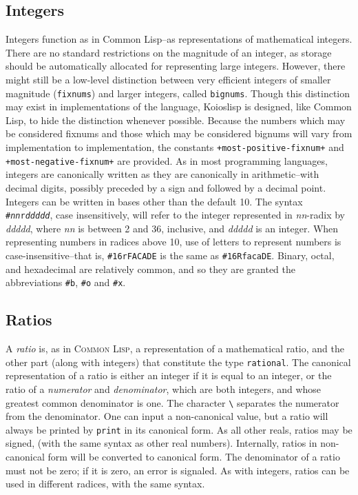 \documentclass[10pt]{book}
\begin{document}
\subsection{Integers}
Integers function as in Common Lisp--as representations of mathematical integers. There are no standard restrictions on the magnitude of an integer, as storage should be automatically allocated for representing large integers. However, there might still be a low-level distinction between very efficient integers of smaller magnitude (\texttt{fixnums}) and larger integers, called \texttt{bignums}. Though this distinction may exist in implementations of the language, Koioslisp is designed, like Common Lisp, to hide the distinction whenever possible. Because the numbers which may be considered fixnums and those which may be considered bignums will vary from implementation to implementation, the constants \texttt{+most-positive-fixnum+} and \texttt{+most-negative-fixnum+} are provided.%
As in most programming languages, integers are canonically written as they are canonically in arithmetic--with decimal digits, possibly preceded by a sign and followed by a decimal point. Integers can be written in bases other than the default 10. The syntax \texttt{\#\textit{nn}r\textit{ddddd}}, case insensitively, will refer to the integer represented in \textit{nn}-radix by \textit{ddddd}, where \textit{nn} is between 2 and 36, inclusive, and \textit{ddddd} is an integer. When representing numbers in radices above 10, use of letters to represent numbers is case-insensitive--that is, \texttt{\#16rFACADE} is the same as \texttt{\#16RfacaDE}. Binary, octal, and hexadecimal are relatively common, and so they are granted the abbreviations \texttt{\#b}, \texttt{\#o} and \texttt{\#x}.
\subsection{Ratios}
A \textit{ratio} is, as in \textsc{Common Lisp}, a representation of a mathematical ratio, and the other part (along with integers) that constitute the type \texttt{rational}. The canonical representation of a ratio is either an integer if it is equal to an integer, or the ratio of a \textit{numerator} and \textit{denominator}, which are both integers, and whose greatest common denominator is one. The character \texttt{\textbackslash} separates the numerator from the denominator. One can input a non-canonical value, but a ratio will always be printed by \texttt{print} in its canonical form. As all other reals, ratios may be signed, (with the same syntax as other real numbers). Internally, ratios in non-canonical form will be converted to canonical form. The denominator of a ratio must not be zero; if it is zero, an error is signaled. As with integers, ratios can be used in different radices, with the same syntax.
\end{document}

